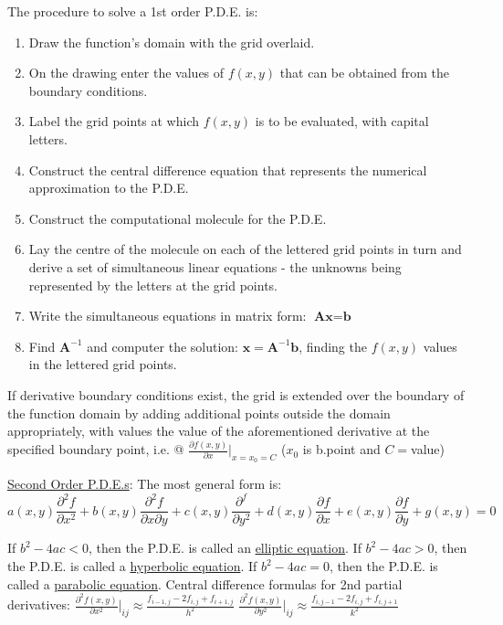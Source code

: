 \documentclass[12pt]{article}
\begin{document}
\begin{flushleft}
	\textbullet \quad The procedure to solve a 1st order P.D.E. is:  
	\begin{enumerate}
	\item Draw the function's domain with the grid overlaid. 
	\item On the drawing enter the values of $f(x,y)$ that can be obtained from the boundary conditions. 
	\item Label the grid points at which $f(x,y)$ is to be evaluated, with capital letters. 
	\item Construct the central difference equation that represents the numerical approximation to the P.D.E. 
	\item Construct the computational molecule for the P.D.E. 
	\item Lay the centre of the molecule on each of the lettered grid points in turn and derive a set of simultaneous linear equations - the unknowns being represented by the letters at the grid points. 
	\item Write the simultaneous equations in matrix form: $\textbf{A} \textbf{x} = \textbf{b}$ 
	\item Find $\textbf{A}^{-1}$ and computer the solution: $\textbf{x} = \textbf{A}^{-1} \textbf{b}$, finding the $f(x,y)$ values in the lettered grid points. 
	\end{enumerate} 

	\textbullet \quad If derivative boundary conditions exist, the grid is extended over the boundary of the function domain by adding additional points outside the domain appropriately, with values the value of the aforementioned derivative at the specified boundary point, i.e. @ $\displaystyle \frac{\partial f(x,y)}{\partial x} \big|_{x=x_0=C}$ ($x_0$ is b.point and $C=$value) \linebreak 
	
	\textbullet \quad \uline{Second Order P.D.E.s}: The most general form is: \linebreak 
	$$ a(x,y) \frac{\partial^2 f}{\partial x^2} + b(x,y) \frac{\partial^2 f}{\partial x \partial y} + c(x,y) \frac{\partial^f}{\partial y^2} + d(x,y) \frac{\partial f}{\partial x} + e(x,y) \frac{\partial f}{\partial y} + g(x,y) = 0 $$
	
	\textbullet \quad If $b^2 -4ac < 0$, then the P.D.E. is called an \uline{elliptic equation}. \linebreak 
	\textbullet \quad If $b^2 -4ac > 0$, then the P.D.E. is called a \uline{hyperbolic equation}. \linebreak 
	\textbullet \quad If $b^2 -4ac = 0$, then the P.D.E. is called a \uline{parabolic equation}. \linebreak 
	\textbullet \quad Central difference formulas for 2nd partial derivatives: \linebreak 
	$\displaystyle \frac{\partial^2 f(x,y)}{\partial x^2} \big|_{ij} \approx \frac{f_{i-1,j}-2f_{i,j}+f_{i+1,j}}{h^2} $ \linebreak 
	$\displaystyle \frac{\partial^2 f(x,y)}{\partial y^2} \big|_{ij} \approx \frac{f_{i,j-1} -2f_{i,j} + f_{i,j+1}}{k^2} $ \linebreak 
	

\end{flushleft}
\end{document}
